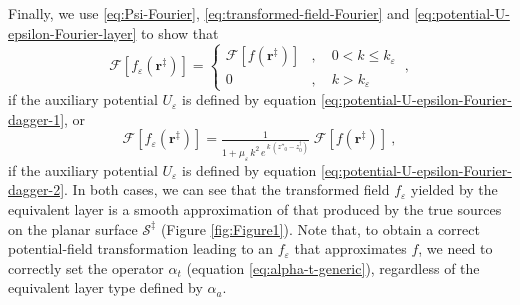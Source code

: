 Finally, we use \ref{eq:Psi-Fourier}, \ref{eq:transformed-field-Fourier} and \ref{eq:potential-U-epsilon-Fourier-layer} to show that
\begin{equation}
	\mathcal{F} [ f_{\varepsilon}(\mathbf{r}^{\ddagger}) ] = 
	\begin{cases}
		\mathcal{F} [ f(\mathbf{r}^{\ddagger}) ] &
		, \quad 0 < k \le k_{\varepsilon} \\
		0 & , \quad k > k_{\varepsilon} 
	\end{cases} \: ,
	\label{eq:transformed-field-continuous-layer-1-Fourier}
\end{equation}
if the auxiliary potential $U_{\varepsilon}$ is defined by equation \ref{eq:potential-U-epsilon-Fourier-dagger-1},
or
\begin{equation}
	\mathcal{F} [ f_{\varepsilon}(\mathbf{r}^{\ddagger}) ] = 
	\tfrac{1}{1 + \mu_{\varepsilon} \, k^{2} \, e^{\, k \, (z''_{0} - z^{\dagger}_{0})}} \; 
	\mathcal{F} [ f(\mathbf{r}^{\ddagger}) ] \: ,
	\label{eq:transformed-field-continuous-layer-2-Fourier}
\end{equation}
if the auxiliary potential $U_{\varepsilon}$ is defined by equation \ref{eq:potential-U-epsilon-Fourier-dagger-2}.
In both cases, we can see that the transformed field $f_{\varepsilon}$ yielded by the equivalent layer 
is a smooth approximation of that produced by the true sources on the planar surface $\mathcal{S}^{\ddagger}$
(Figure \ref{fig:Figure1}). Note that, to obtain a correct potential-field transformation leading to an $f_{\varepsilon}$ 
that approximates $f$, we need to correctly set the operator $\alpha_{t}$ (equation \ref{eq:alpha-t-generic}), 
regardless of the equivalent layer type defined by $\alpha_{a}$.


